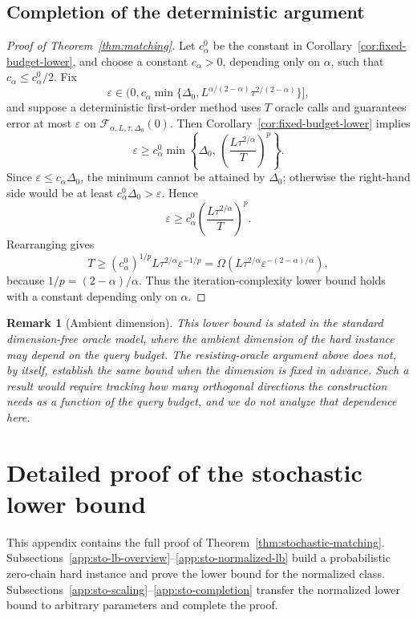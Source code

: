 \documentclass[11pt]{article}
\newtheorem{remark}[theorem]{Remark}
\begin{document}
\subsection{Completion of the deterministic argument}
\label{app:det-completion}

\begin{proof}[Proof of Theorem~\ref{thm:matching}]
Let \(c_\alpha^0\) be the constant in Corollary~\ref{cor:fixed-budget-lower}, and choose a constant
\(c_\alpha>0\), depending only on \(\alpha\), such that \(c_\alpha\le c_\alpha^0/2\). Fix
\[
\varepsilon\in\bigl(0,c_\alpha\min\{\Delta_0,L^{\alpha/(2-\alpha)}\tau^{2/(2-\alpha)}\}\bigr],
\]
and suppose a deterministic first-order method uses \(T\) oracle calls and guarantees error at most \(\varepsilon\) on
\(\mathcal F_{\alpha,L,\tau,\Delta_0}(0)\). Then Corollary~\ref{cor:fixed-budget-lower} implies
\[
\varepsilon
\ge
c_\alpha^0
\min\!\left\{
\Delta_0,\,
\left(\frac{L\tau^{2/\alpha}}{T}\right)^p
\right\}.
\]
Since \(\varepsilon\le c_\alpha\Delta_0\), the minimum cannot be attained by
\(\Delta_0\); otherwise the right-hand side would be at least \(c_\alpha^0\Delta_0> \varepsilon\). Hence
\[
\varepsilon
\ge
c_\alpha^0
\left(\frac{L\tau^{2/\alpha}}{T}\right)^p.
\]
Rearranging gives
\[
T
\ge
(c_\alpha^0)^{1/p}L\tau^{2/\alpha}\varepsilon^{-1/p}
=
\Omega\left(L\tau^{2/\alpha}\varepsilon^{-(2-\alpha)/\alpha}\right),
\]
because $1/p=(2-\alpha)/\alpha$.
Thus the iteration-complexity lower bound holds with a constant depending only on \(\alpha\).
\end{proof}

\begin{remark}[Ambient dimension]
This lower bound is stated in the standard dimension-free oracle model, where the ambient dimension of the hard
instance may depend on the query budget. The resisting-oracle argument above does not, by itself, establish the same
bound when the dimension is fixed in advance. Such a result would require tracking how many orthogonal directions the
construction needs as a function of the query budget, and we do not analyze that dependence here.
\end{remark}

\section{Detailed proof of the stochastic lower bound}
\label{app:stochastic}

This appendix contains the full proof of Theorem~\ref{thm:stochastic-matching}.
Subsections~\ref{app:sto-lb-overview}--\ref{app:sto-normalized-lb} build a probabilistic zero-chain hard instance and
prove the lower bound for the normalized class.
Subsections~\ref{app:sto-scaling}--\ref{app:sto-completion} transfer the normalized lower bound to arbitrary
parameters and complete the proof.
\end{document}
